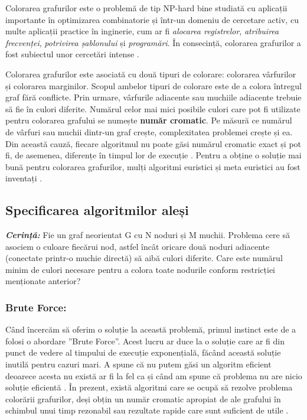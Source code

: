 \documentclass[runningheads]{llncs}
\begin{document}
Colorarea grafurilor este o problemă de tip NP-hard bine studiată cu aplicații 
importante în optimizarea combinatorie și într-un domeniu de cercetare activ, cu 
multe aplicații practice \cite{4} în inginerie, cum ar fi \textit{alocarea registrelor}, 
\textit{atribuirea frecvenței}, \textit{potrivirea șablonului} și \textit{programări}. 
În consecință, colorarea grafurilor a fost subiectul unor cercetări intense \cite{5} \cite{2}.

Colorarea grafurilor este asociată cu două tipuri de colorare: colorarea vârfurilor 
și colorarea marginilor. Scopul ambelor tipuri de colorare este de a colora întregul graf fără
conflicte. Prin urmare, vârfurile adiacente sau muchiile adiacente trebuie
să fie în culori diferite. Numărul celor mai mici
posibile culori care pot fi utilizate pentru colorarea grafului se numește 
\textbf{număr cromatic}.
Pe măsură ce numărul de vârfuri sau muchii dintr-un graf crește,
complexitatea problemei crește și ea. Din această cauză, fiecare
algoritmul nu poate găsi numărul cromatic exact  
și pot fi, de asemenea, diferențe în timpul lor de execuție \cite{6}. Pentru a obține 
o soluție mai bună pentru colorarea grafurilor, mulți algoritmi euristici și meta
euristici au fost inventați \cite{7}.
% 
\subsection{Specificarea algoritmilor aleși}

\textbf{\textit{Cerință:}} Fie un graf neorientat G cu N noduri și M muchii. Problema cere să asociem o culoare 
fiecărui nod, astfel încât oricare două noduri adiacente (conectate printr-o muchie directă) 
să aibă culori diferite. Care este numărul minim de culori necesare pentru a colora 
toate nodurile conform restricției menționate anterior? \cite{8}

\subsubsection{Brute Force:}
Când încercăm să oferim o soluție la această problemă, primul instinct este de a
folosi o abordare ”Brute Force”. Acest lucru ar duce la o soluție care ar fi 
din punct de vedere al timpului de execuție exponențială, făcând această soluție 
inutilă pentru cazuri mari. A spune că nu putem găsi un algoritm eficient 
deoarece acesta nu există ar fi la fel ca și când am spune că problema nu are 
nicio soluție eficientă \cite{9}.
În prezent, există algoritmi care se ocupă să rezolve problema colorării grafurilor, 
deși obțin un număr cromatic apropiat de ale grafului în schimbul unui timp
rezonabil sau rezultate rapide care sunt suficient de utile \cite{10}.
\end{document}

